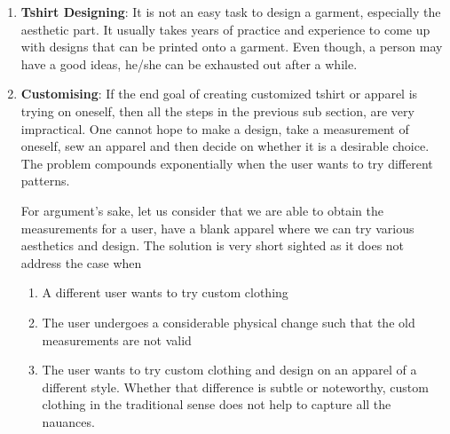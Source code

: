 \documentclass{article}
\begin{document}
	\begin{enumerate}
		
		\item \textbf{Tshirt Designing}:
		It is not an easy task to design a garment, especially the aesthetic part. It usually takes years of practice and experience to come up with designs that can be printed onto a garment. Even though, a person may have a good ideas, he/she can be exhausted out after a while.
		\item \textbf{Customising}:
		If the end goal of creating customized tshirt or apparel is trying on oneself, then all the steps in the previous sub section, are very impractical. One cannot hope to make a design, take a measurement of oneself, sew an apparel and then decide on whether it is a desirable choice. The problem compounds exponentially when the user wants to try different patterns. 
		
		For argument's sake, let us consider that we are able to obtain the measurements for a user, have a blank apparel where we can try various aesthetics and design. The solution is very short sighted as it does not address the case when 
		\begin{enumerate}
		\item A different user wants to try custom clothing
		
		\item The user undergoes a considerable physical change such that the old measurements are not valid
		
		\item The user wants to try custom clothing and design on an apparel of a different style. Whether that difference is subtle or noteworthy, custom clothing in the traditional sense does not help to capture all the nauances.
		\end{enumerate}
	\end{enumerate} 
	
\end{document}
